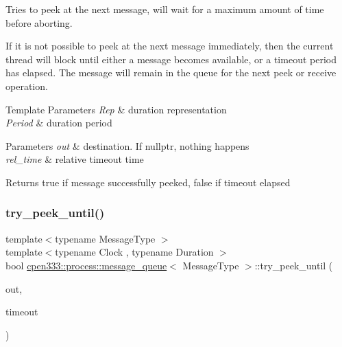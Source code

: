Tries to peek at the next message, will wait for a maximum amount of time before aborting. 

If it is not possible to peek at the next message immediately, then the current thread will block until either a message becomes available, or a timeout period has elapsed. The message will remain in the queue for the next {\ttfamily peek} or {\ttfamily receive} operation.


\begin{DoxyTemplParams}{Template Parameters}
{\em Rep} & duration representation \\
\hline
{\em Period} & duration period \\
\hline
\end{DoxyTemplParams}

\begin{DoxyParams}{Parameters}
{\em out} & destination. If {\ttfamily nullptr}, nothing happens \\
\hline
{\em rel\+\_\+time} & relative timeout time \\
\hline
\end{DoxyParams}
\begin{DoxyReturn}{Returns}
{\ttfamily true} if message successfully peeked, {\ttfamily false} if timeout elapsed 
\end{DoxyReturn}
\mbox{\label{classcpen333_1_1process_1_1message__queue_ae518346095033df725270dfeb866cdb4}} 
\subsubsection{\texorpdfstring{try\+\_\+peek\+\_\+until()}{try\_peek\_until()}}
{\footnotesize\ttfamily template$<$typename Message\+Type $>$ \\
template$<$typename Clock , typename Duration $>$ \\
bool \hyperlink{classcpen333_1_1process_1_1message__queue}{cpen333\+::process\+::message\+\_\+queue}$<$ Message\+Type $>$\+::try\+\_\+peek\+\_\+until (\begin{DoxyParamCaption}\item[{Message\+Type $\ast$}]{out,  }\item[{const std\+::chrono\+::time\+\_\+point$<$ Clock, Duration $>$ \&}]{timeout }\end{DoxyParamCaption})\hspace{0.3cm}{\ttfamily [inline]}}



